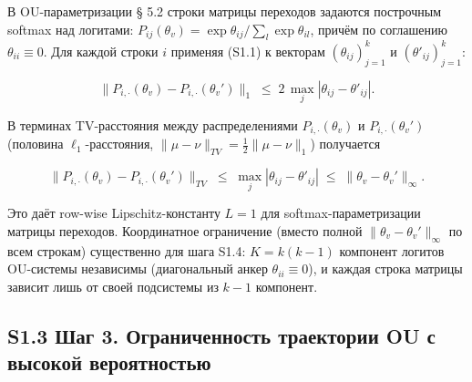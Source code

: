 \documentclass[pdflatex,sn-mathphys-ay]{sn-jnl}
\begin{document}
В OU-параметризации § 5.2 строки матрицы переходов задаются построчным softmax над логитами: \(P_{ij}(\theta_v) = \exp \theta_{ij} / \sum_l \exp\theta_{il}\), причём по соглашению \(\theta_{ii} \equiv 0\). Для каждой строки \(i\) применяя (S1.1) к векторам \((\theta_{ij})_{j=1}^k\) и \((\theta'_{ij})_{j=1}^k\):



\[\|P_{i,\cdot}(\theta_v) - P_{i,\cdot}(\theta_v')\|_1 \;\le\; 2 \, \max_j |\theta_{ij} - \theta'_{ij}|.\]



В терминах TV-расстояния между распределениями \(P_{i,\cdot}(\theta_v)\) и \(P_{i,\cdot}(\theta_v')\) (половина \(\ell_1\)-расстояния, \(\|\mu - \nu\|_{TV} = \frac{1}{2}\|\mu - \nu\|_1\)) получается



\begin{equation}\|P_{i,\cdot}(\theta_v) - P_{i,\cdot}(\theta_v')\|_{TV} \;\le\; \max_j |\theta_{ij} - \theta'_{ij}| \;\le\; \|\theta_v - \theta_v'\|_\infty. \tag{S1.2}\end{equation}



Это даёт row-wise Lipschitz-константу \(L = 1\) для softmax-параметризации матрицы переходов. Координатное ограничение (вместо полной \(\|\theta_v - \theta_v'\|_\infty\) по всем строкам) существенно для шага S1.4: \(K = k(k-1)\) компонент логитов OU-системы независимы (диагональный анкер \(\theta_{ii} \equiv 0\)), и каждая строка матрицы зависит лишь от своей подсистемы из \(k-1\) компонент.



\subsection*{S1.3 Шаг 3. Ограниченность траектории OU с высокой вероятностью}\label{s1.3-ux448ux430ux433-3.-ux43eux433ux440ux430ux43dux438ux447ux435ux43dux43dux43eux441ux442ux44c-ux442ux440ux430ux435ux43aux442ux43eux440ux438ux438-ou-ux441-ux432ux44bux441ux43eux43aux43eux439-ux432ux435ux440ux43eux44fux442ux43dux43eux441ux442ux44cux44e}
\end{document}
